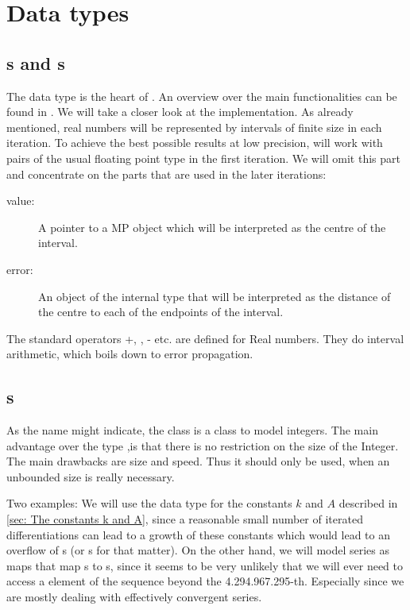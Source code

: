\section{Data types}

\subsection{s and s}

The data type  is the heart of \irram. An overview over the main functionalities can be found in \cite{Muller2013}. We will take a closer look at the implementation. As already mentioned, real numbers will be represented by intervals of finite size in each iteration. To achieve the best possible results at low precision, \irram will work with pairs of the usual floating point type  in the first iteration. We will omit this part and concentrate on the parts that are used in the later iterations:
\begin{description}
\item[value:] A pointer to a MP object which will be interpreted as the centre of the interval.
\item[error:] An object of the \irram internal type  that will be interpreted as the distance of the centre to each of the endpoints of the interval.
\end{description}
The standard operators \code +, \code *, \code - etc. are defined for Real numbers. They do interval arithmetic, which boils down to error propagation.

\subsection{s}

As the name might indicate, the class  is a class to model integers. The main advantage over the \cc type ,is that there is no restriction on the size of the Integer. The main drawbacks are size and speed. Thus it should only be used, when an unbounded size is really necessary.

Two examples: We will use the data type  for the constants $k$ and $A$ described in \cref{sec: The constants k and A}, since a reasonable small number of iterated differentiations can lead to a growth of these constants which would lead to an overflow of s (or s for that matter). On the other hand, we will model series as maps that map s to s, since it seems to be very unlikely that we will ever need to access a element of the sequence beyond the 4.294.967.295-th. Especially since we are mostly dealing with effectively convergent series. 


